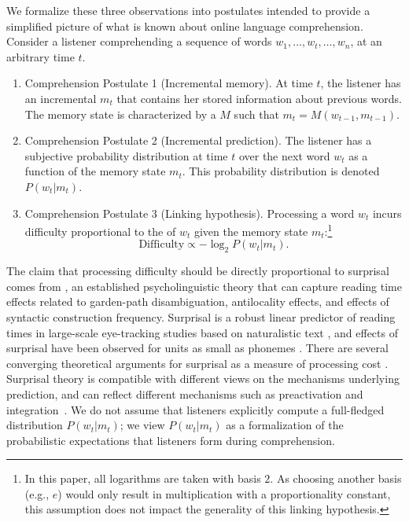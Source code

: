 We formalize these three observations into postulates intended to provide a simplified picture of what is known about online language comprehension. Consider a listener comprehending a sequence of words $w_1, \dots, w_t, \dots, w_n$, at an arbitrary time $t$.
\begin{enumerate}
    \item Comprehension Postulate 1 (Incremental memory). At time $t$, the listener has an incremental  $m_t$ that contains her stored information about previous words. The memory state is characterized by a  $M$ such that $m_t = M(w_{t-1}, m_{t-1})$.
    \item Comprehension Postulate 2 (Incremental prediction). The listener has a subjective probability distribution at time $t$ over the next word $w_t$ as a function of the memory state $m_t$. This probability distribution is denoted $P(w_t|m_t)$.
    \item Comprehension Postulate 3 (Linking hypothesis). Processing a word $w_t$ incurs difficulty proportional to the  of $w_t$ given the memory state $m_t$:\footnote{In this paper, all logarithms are taken with basis $2$. As choosing another basis (e.g., $e$) would only result in multiplication with a proportionality constant, this assumption does not impact the generality of this linking hypothesis.}
    \begin{equation}
    \label{eq:lossy-surp}
    \text{Difficulty} \propto -\log_2 P(w_t | m_t).
\end{equation}
\end{enumerate}
The claim that processing difficulty should be directly proportional to surprisal comes from  \citep{hale2001probabilistic,levy2008expectation}, an established psycholinguistic theory that can capture reading time effects related to garden-path disambiguation, antilocality effects, and effects of syntactic construction frequency. Surprisal is a robust linear predictor of reading times in large-scale eye-tracking studies based on naturalistic text \citep{smith2013effect,goodkind-predictive-2018,frank2019interaction,aurnhammer2019evaluating,wilcox2020predictive}, and effects of surprisal have been observed for units as small as phonemes \citep{gwilliams2020neural}. There are several converging theoretical arguments for surprisal as a measure of processing cost \citep{levy2008expectation,smith2013effect}.
Surprisal theory is compatible with different views on the mechanisms underlying prediction, and can reflect different mechanisms such as preactivation and integration~\citep{kuperberg2016we}.
We do not assume that listeners explicitly compute a full-fledged distribution $P(w_t|m_t)$; we view $P(w_t|m_t)$ as a formalization of the probabilistic expectations that listeners form during comprehension.

